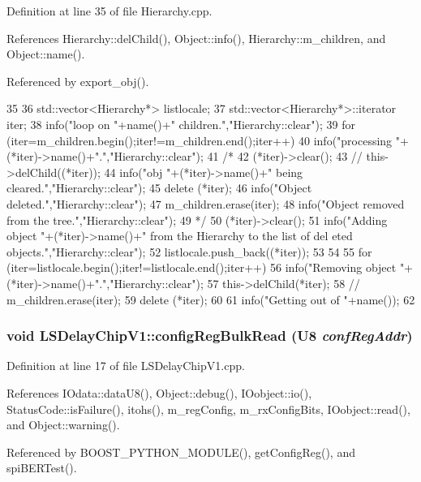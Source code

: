 Definition at line 35 of file Hierarchy.cpp.

References Hierarchy::delChild(), Object::info(), Hierarchy::m\_\-children, and Object::name().

Referenced by export\_\-obj().


\begin{DoxyCode}
35                      {
36   std::vector<Hierarchy*> listlocale;
37   std::vector<Hierarchy*>::iterator iter;
38   info("loop on "+name()+" children.","Hierarchy::clear");
39   for (iter=m_children.begin();iter!=m_children.end();iter++){
40       info("processing "+(*iter)->name()+".","Hierarchy::clear");
41 /*
42       (*iter)->clear();
43 //      this->delChild((*iter));
44       info("obj "+(*iter)->name()+" being cleared.","Hierarchy::clear");
45       delete (*iter);
46       info("Object deleted.","Hierarchy::clear");
47       m_children.erase(iter);
48       info("Object removed from the tree.","Hierarchy::clear");
49 */
50     (*iter)->clear();
51     info("Adding object "+(*iter)->name()+" from the Hierarchy to the list of del
      eted objects.","Hierarchy::clear");
52     listlocale.push_back((*iter));
53   }
54 
55   for (iter=listlocale.begin();iter!=listlocale.end();iter++){
56     info("Removing object "+(*iter)->name()+".","Hierarchy::clear");
57     this->delChild(*iter);
58 //    m_children.erase(iter);
59     delete (*iter);
60   }
61   info("Getting out of "+name());
62 }
\end{DoxyCode}
\hypertarget{classLSDelayChipV1_a97a50092ce40f6322db946fc580f7230}{
\subsubsection[{configRegBulkRead}]{\setlength{\rightskip}{0pt plus 5cm}void LSDelayChipV1::configRegBulkRead ({\bf U8} {\em confRegAddr})}}
\label{classLSDelayChipV1_a97a50092ce40f6322db946fc580f7230}


Definition at line 17 of file LSDelayChipV1.cpp.

References IOdata::dataU8(), Object::debug(), IOobject::io(), StatusCode::isFailure(), itohs(), m\_\-regConfig, m\_\-rxConfigBits, IOobject::read(), and Object::warning().

Referenced by BOOST\_\-PYTHON\_\-MODULE(), getConfigReg(), and spiBERTest().


